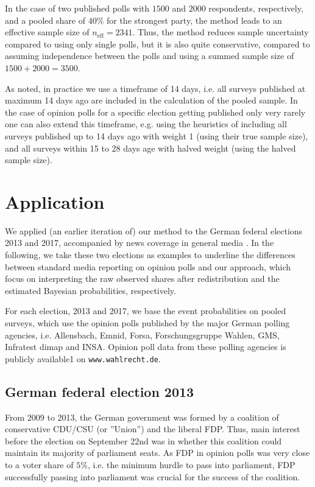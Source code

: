 \documentclass[smallcondensed]{svjour3}     %
\begin{document}
In the case of two published polls with $1500$ and $2000$ respondents, respectively, and a pooled share of $40\%$
for the strongest party, the method leads
to an effective sample size of $n_{\text{eff}} = 2341$. Thus, the method reduces sample uncertainty
compared to using only single polls, but it is also quite conservative, compared to
assuming independence between the polls and using a summed sample size of $1500 + 2000 = 3500$.

As noted, in practice we use a timeframe of 14 days, i.e. all surveys published at maximum 14 days ago are included
in the calculation of the pooled sample. In the case of opinion polls for a specific election getting published
only very rarely one can also extend this timeframe, e.g. using the heuristics of including all surveys published up to 14 days
ago with weight 1 (using their true sample size), and all surveys within 15 to 28 days age with halved weight
(using the halved sample size).



\section{Application} \label{sec:application}
We applied (an earlier iteration of) our method to the German federal elections
2013 and 2017, accompanied by news coverage in general media \citep[cf.][]{wahlistik_2013, gelitz_2017}.
In the following, we take these two elections as examples to underline
the differences between standard media reporting on opinion polls and our approach,
which focus on interpreting the raw observed shares after redistribution and
the estimated Bayesian probabilities, respectively.

For each election, 2013 and 2017, we base the event probabilities on
pooled surveys, which use the opinion polls published by the major
German polling agencies, i.e. Allensbach, Emnid, Forsa, Forschungsgruppe Wahlen,
GMS, Infratest dimap and INSA.
Opinion poll data from these polling agencies is publicly available1
on \texttt{www.wahlrecht.de}. 


\subsection{German federal election 2013} \label{subsec:2013}
From 2009 to 2013, the German government was formed by a coalition of 
conservative CDU/CSU (or ''Union'') and the liberal FDP. 
Thus, main interest before the election on September 22nd was in whether this
coalition could maintain its majority of parliament seats. As FDP in opinion
polls was very close to a voter share of $5\%$, i.e. the minimum hurdle to
pass into parliament, FDP successfully passing into parliament was crucial
for the success of the coalition.
\end{document}
